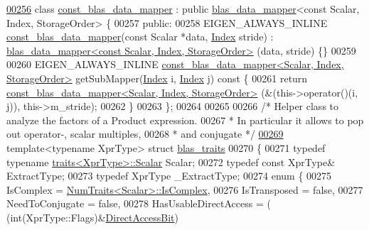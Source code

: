 \begin{DoxyCode}
\hyperlink{class_eigen_1_1internal_1_1const__blas__data__mapper}{00256} \textcolor{keyword}{class }\hyperlink{class_eigen_1_1internal_1_1const__blas__data__mapper}{const\_blas\_data\_mapper} : \textcolor{keyword}{public} \hyperlink{class_eigen_1_1internal_1_1blas__data__mapper}{blas\_data\_mapper}<const Scalar, 
      Index, StorageOrder> \{
00257   \textcolor{keyword}{public}:
00258   EIGEN\_ALWAYS\_INLINE \hyperlink{class_eigen_1_1internal_1_1const__blas__data__mapper}{const\_blas\_data\_mapper}(\textcolor{keyword}{const} Scalar *data, 
      \hyperlink{namespace_eigen_a62e77e0933482dafde8fe197d9a2cfde}{Index} stride) : \hyperlink{class_eigen_1_1internal_1_1blas__data__mapper}{blas\_data\_mapper<const Scalar, Index, StorageOrder>}
      (data, stride) \{\}
00259 
00260   EIGEN\_ALWAYS\_INLINE \hyperlink{class_eigen_1_1internal_1_1const__blas__data__mapper}{const\_blas\_data\_mapper<Scalar, Index, StorageOrder>}
       getSubMapper(\hyperlink{namespace_eigen_a62e77e0933482dafde8fe197d9a2cfde}{Index} i, \hyperlink{namespace_eigen_a62e77e0933482dafde8fe197d9a2cfde}{Index} j)\textcolor{keyword}{ const }\{
00261     \textcolor{keywordflow}{return} \hyperlink{class_eigen_1_1internal_1_1const__blas__data__mapper}{const\_blas\_data\_mapper<Scalar, Index, StorageOrder>}
      (&(this->operator()(i, j)), this->m\_stride);
00262   \}
00263 \};
00264 
00265 
00266 \textcolor{comment}{/* Helper class to analyze the factors of a Product expression.}
00267 \textcolor{comment}{ * In particular it allows to pop out operator-, scalar multiples,}
00268 \textcolor{comment}{ * and conjugate */}
\hyperlink{struct_eigen_1_1internal_1_1blas__traits}{00269} \textcolor{keyword}{template}<\textcolor{keyword}{typename} XprType> \textcolor{keyword}{struct }\hyperlink{struct_eigen_1_1internal_1_1blas__traits}{blas\_traits}
00270 \{
00271   \textcolor{keyword}{typedef} \textcolor{keyword}{typename} \hyperlink{struct_eigen_1_1internal_1_1traits}{traits<XprType>::Scalar} Scalar;
00272   \textcolor{keyword}{typedef} \textcolor{keyword}{const} XprType& ExtractType;
00273   \textcolor{keyword}{typedef} XprType \_ExtractType;
00274   \textcolor{keyword}{enum} \{
00275     IsComplex = \hyperlink{group___core___module_struct_eigen_1_1_num_traits}{NumTraits<Scalar>::IsComplex},
00276     IsTransposed = \textcolor{keyword}{false},
00277     NeedToConjugate = \textcolor{keyword}{false},
00278     HasUsableDirectAccess = (    (int(XprType::Flags)&\hyperlink{group__flags_gabf1e9d0516a933445a4c307ad8f14915}{DirectAccessBit})

\end{DoxyCode}
